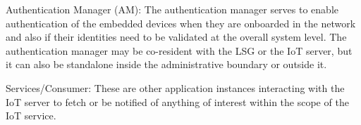 Authentication Manager (AM): The authentication manager serves to enable authentication of the embedded devices when they are onboarded in the network and also if their identities need to be validated at the overall system level. The authentication manager may be co-resident with the LSG or the IoT server, but it can also be standalone inside the administrative boundary or outside it.\par
Services/Consumer: These are other application instances interacting with the IoT server to fetch or be notified of anything of interest within the scope of the IoT service.\par






